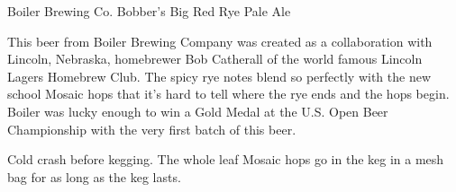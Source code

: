 \stylesection{\styleamericanale}

\begin{recipie}{Boiler Brewing Co. Bobber's Big Red Rye Pale Ale}

\begin{aboutblock}
This beer from Boiler Brewing Company was created as a collaboration with Lincoln, Nebraska,
homebrewer Bob Catherall of the world famous Lincoln Lagers Homebrew Club. The spicy rye notes
blend so perfectly with the new school Mosaic hops that it's hard to tell where the rye ends
and the hops begin. Boiler was lucky enough to win a Gold Medal at the U.S. Open Beer Championship
with the very first batch of this beer.
\end{aboutblock}


\begin{methodandtiming}
 
\begin{mashsteps}
\end{mashsteps}

\begin{fermentationsteps}
\end{fermentationsteps}

\begin{directions}
Cold crash before kegging. The whole leaf Mosaic hops go in the keg in a mesh bag
for as long as the keg lasts.
\end{directions}

\end{methodandtiming}

\pagebreak

\begin{ingredientsblock}

\begin{malts}
\end{malts}

\begin{hops}
\end{hops}

\begin{yeasts}
\end{yeasts}

\end{ingredientsblock}

\end{recipie}

